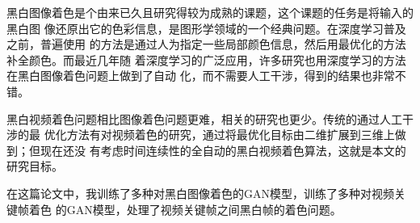 
\begin{cabstract}
  黑白图像着色是个由来已久且研究得较为成熟的课题，这个课题的任务是将输入的黑白图
  像还原出它的色彩信息，是图形学领域的一个经典问题。在深度学习普及之前，普遍使用
  的方法是通过人为指定一些局部颜色信息，然后用最优化的方法补全颜色。而最近几年随
  着深度学习的广泛应用，许多研究也用深度学习的方法在黑白图像着色问题上做到了自动
  化，而不需要人工干涉，得到的结果也非常不错。

  黑白视频着色问题相比图像着色问题更难，相关的研究也更少。传统的通过人工干涉的最
  优化方法有对视频着色的研究，通过将最优化目标由二维扩展到三维上做到；但现在还没
  有考虑时间连续性的全自动的黑白视频着色算法，这就是本文的研究目标。

  在这篇论文中，我训练了多种对黑白图像着色的GAN模型，训练了多种对视频关键帧着色
  的GAN模型，处理了视频关键帧之间黑白帧的着色问题。
\end{cabstract}

